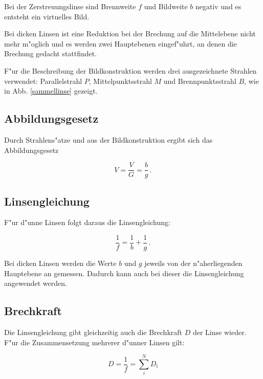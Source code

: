 	Bei der Zerstreuungslinse sind Brennweite $f$ und Bildweite $b$ negativ und es entsteht ein virtuelles Bild.

	Bei dicken Linsen ist eine Reduktion bei der Brechung auf die Mittelebene nicht mehr m"oglich und es werden zwei Hauptebenen eingef"uhrt, an denen die Brechung gedacht stattfindet.

	F"ur die Beschreibung der Bildkonstruktion werden drei ausgezeichnete Strahlen verwendet:
	Parallelstrahl $P$, Mittelpunktsstrahl $M$ und Brennpunktsstrahl $B$, wie in Abb. \eqref{sammellinse} gezeigt.

	\subsection{Abbildungsgesetz} %
	\label{sub:abbildungsgesetz}
	
	Durch Strahlens"atze und aus der Bildkonstruktion ergibt sich das Abbildungsgesetz

	\begin{equation}
		V = \frac{V}{G} = \frac{b}{g}\, .
	\end{equation}

	\subsection{Linsengleichung} %
	\label{sub:linsengleichung}
	
	F"ur d"unne Linsen folgt daraus die Linsengleichung:

	\begin{equation}
		\frac{1}{f} = \frac{1}{b} + \frac{1}{g}\, .
	\end{equation}

	Bei dicken Linsen werden die Werte $b$ und $g$ jeweils von der n"aherliegenden Hauptebene an gemessen. Dadurch kann auch bei dieser die Linsengleichung angewendet werden.

	\subsection{Brechkraft} %
	\label{sub:brechkraft}
	
	Die Linsengleichung gibt gleichzeitig auch die Brechkraft $D$ der Linse wieder. F"ur die Zusammensetzung mehrerer d"unner Linsen gilt:

	\begin{equation}
		D = \frac{1}{f} = \sum_i^N D_\mathrm{i} \label{brechkraft}
	\end{equation}

